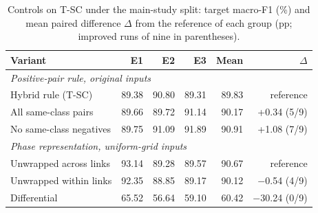 \begin{table}[t]
\caption{Controls on T-SC under the main-study split: target macro-F1 (\%) and mean paired difference $\Delta$ from the reference of each group (pp; improved runs of nine in parentheses).}
\label{tab:control}
\centering\footnotesize
\setlength{\tabcolsep}{3.4pt}
\begin{tabular}{lrrrrr}
\toprule
Variant & E1 & E2 & E3 & Mean & $\Delta$\\
\midrule
\multicolumn{6}{l}{\textit{Positive-pair rule, original inputs}}\\
Hybrid rule (T-SC) & 89.38 & 90.80 & 89.31 & 89.83 & reference\\
All same-class pairs & 89.66 & 89.72 & 91.14 & 90.17 & +0.34 (5/9)\\
No same-class negatives & 89.75 & 91.09 & 91.89 & 90.91 & +1.08 (7/9)\\
\midrule
\multicolumn{6}{l}{\textit{Phase representation, uniform-grid inputs}}\\
Unwrapped across links & 93.14 & 89.28 & 89.57 & 90.67 & reference\\
Unwrapped within links & 92.35 & 88.85 & 89.17 & 90.12 & $-$0.54 (4/9)\\
Differential & 65.52 & 56.64 & 59.10 & 60.42 & $-$30.24 (0/9)\\
\bottomrule
\end{tabular}
\end{table}

